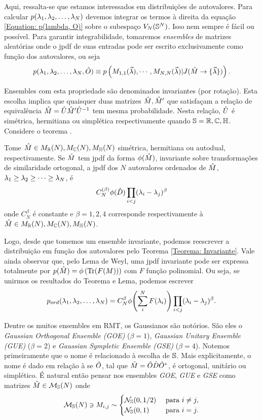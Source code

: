 \documentclass[12pt]{report}
\begin{document}
Aqui, ressalta-se que estamos interessados em distribuições de autovalores. Para calcular $p(\lambda_1, \lambda_2, \dots, \lambda_N)$ devemos integrar os termos à direita da equação \ref{Equation: p(lambda, O)} sobre o subespaço $V_N(\mathbb{S}^N)$. Isso nem sempre é fácil ou possível. Para garantir integrabilidade, tomaremos \textit{ensembles} de matrizes aleatórias onde o jpdf de suas entradas pode ser escrito exclusivamente como função dos autovalores, ou seja $$p(\lambda_1, \lambda_2, \dots, \lambda_N, \hat O) \equiv p \left( M_{1,1}(\vec{\lambda}), \cdots, M_{N,N}(\vec{\lambda}) | J(\hat M \rightarrow \{ \vec{\lambda} \} ) \right).$$

Ensembles com esta propriedade são denominados invariantes (por rotação). Esta escolha implica que quaisquer duas matrizes $\hat M, \hat M'$ que satisfaçam a relação de equivalência $\hat M = \hat U \hat M' \hat U^{-1}$ tem mesma probabilidade. Nesta relação, $\hat U$ é simétrica, hermitiana ou simplética respectivamente quando $\mathbb{S} = \mathbb{R},\mathbb{C},\mathbb{H} $. Considere o teorema \cite[Capítulo~3]{AlanThesis}.
\begin{thm}
	Tome $\hat M \in M_{\mathbb{R}}(N),  M_{\mathbb{C}}(N),  M_{\mathbb{H}}(N)$ simétrica, hermitiana ou autodual, respectivamente. Se  $\hat M$ tem jpdf da forma $\phi(\hat M)$, invariante sobre transformações de similaridade ortogonal, a jpdf dos $N$ autovalores ordenados de $\hat M$, $\lambda_1 \geq \lambda_2 \geq \dots \geq \lambda_N$, é $$ C_{N}^{(\beta)} \phi(\hat D) \prod_{i < j} (\lambda_i - \lambda_j)^{\beta}$$ onde $C_{N}^{\beta}$ é constante e $\beta = 1, 2, 4$ corresponde respectivamente à $\hat M \in M_{\mathbb{R}}(N),  M_{\mathbb{C}}(N),  M_{\mathbb{H}}(N)$. 
	\label{Teorema: Invariante}
\end{thm}
Logo, desde que tomemos um ensemble invariante, podemos reescrever a distribuição em função dos autovalores pelo Teorema \ref{Teorema: Invariante}. Vale ainda observar que, pelo Lema de Weyl, uma jpdf invariante pode ser expressa totalmente por $p(\hat M)= \phi \left(\operatorname{Tr}(F(M)) \right)$ com $F$ função polinomial. Ou seja, se unirmos os resultados do Teorema e Lema, podemos escrever
\begin{equation}
	p_{ord}(\lambda_1, \lambda_2, \dots, \lambda_N) = C_{N}^{\beta} \phi{\left( \sum_i^N F(\lambda_i) \right)} \prod_{i < j} (\lambda_i - \lambda_j)^{\beta}.
	\label{Equation: p-ord}
\end{equation}

Dentre os muitos ensembles em RMT, os Gaussianos são notórios. São eles o \textit{Gaussian Orthogonal Ensemble (GOE)} ($\beta=1$), \textit{Gaussian Unitary Ensemble (GUE)} ($\beta=2$) e \textit{Gaussian Sympletic Ensemble (GSE)} ($\beta=4$). Notemos primeiramente que o nome é relacionado à escolha de $\mathbb{S}$. Mais explicitamente, o nome é dado em relação à se $\hat O$, tal que $\hat M = \hat O\hat D\hat O^*$, é ortogonal, unitário ou simplético. É natural então pensar nos ensembles \textit{GOE}, \textit{GUE} e \textit{GSE} como matrizes $\hat M \in \mathcal{M}_{\mathbb{S}}(N)$ onde 
$$
\mathcal{M}_{\mathbb{S}}(N) \ni M_{i,j} \sim
\begin{cases}
	\mathcal{N}_{\mathbb{S}}(0,1/2) &  \ \text{para} \ i \neq j,\\
	\mathcal{N}_{\mathbb{S}}(0,1) & \ \text{para} \ i = j.
\end{cases}
$$
\end{document}
